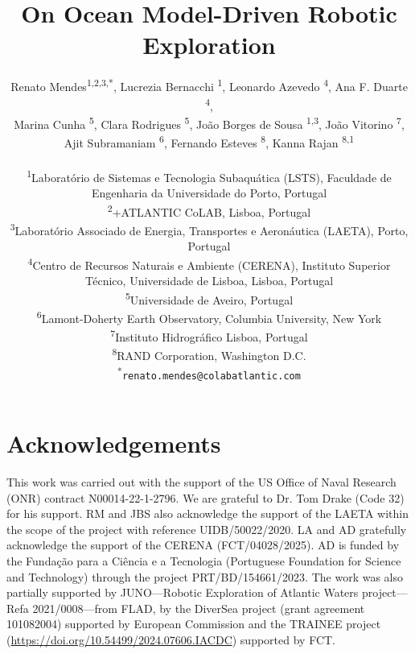 \documentclass[11pt]{article}
\title{On Ocean Model-Driven Robotic Exploration}
\author{
Renato Mendes\textsuperscript{1,2,3,*},
Lucrezia Bernacchi \textsuperscript{1},
Leonardo Azevedo \textsuperscript{4},
Ana F. Duarte \textsuperscript{4},\\
Marina Cunha \textsuperscript{5},
Clara Rodrigues \textsuperscript{5},
Jo\~{a}o Borges de Sousa \textsuperscript{1,3},
Jo\~{a}o Vitorino \textsuperscript{7},\\
Ajit Subramaniam \textsuperscript{6},
Fernando Esteves \textsuperscript{8},
Kanna Rajan \textsuperscript{8,1}
\\
\\
\textsuperscript{1}{\scriptsize Laboratório de Sistemas e Tecnologia Subaquática (LSTS), Faculdade de Engenharia da Universidade do Porto, Portugal}\\
\textsuperscript{2}{\scriptsize +ATLANTIC CoLAB, Lisboa, Portugal}\\
\textsuperscript{3}{\scriptsize Laboratório Associado de Energia, Transportes e Aeronáutica (LAETA), Porto, Portugal}\\
\textsuperscript{4}{\scriptsize Centro de Recursos Naturais e Ambiente (CERENA), Instituto Superior T\'{e}cnico, Universidade de Lisboa, Lisboa, Portugal}\\
\textsuperscript{5}{\scriptsize Universidade de Aveiro, Portugal}\\
\textsuperscript{6}{\scriptsize Lamont-Doherty Earth Observatory, Columbia University, New York}\\
\textsuperscript{7}{\scriptsize Instituto Hidrogr{\'a}fico Lisboa, Portugal}\\
\textsuperscript{8}{\scriptsize RAND Corporation, Washington D.C.}\\
\textsuperscript{*}\texttt{{\scriptsize renato.mendes@colabatlantic.com}}
}
\date{}
\begin{document}
\maketitle







\section{Acknowledgements}

This work was carried out with the support of the US Office of Naval
Research (ONR) contract N00014-22-1-2796. We are grateful to Dr. Tom
Drake (Code 32) for his support. RM and JBS also acknowledge the
support of the LAETA within the scope of the project with reference
UIDB/50022/2020. LA and AD gratefully acknowledge the support of the
CERENA (FCT/04028/2025). AD is funded by the Funda\c{c}\~{a}o para a
Ci\^{e}ncia e a Tecnologia (Portuguese Foundation for Science and
Technology) through the project PRT/BD/154661/2023. The work was also
partially supported by JUNO—Robotic Exploration of Atlantic Waters
project—Refa 2021/0008—from FLAD, by the DiverSea project (grant
agreement 101082004) supported by European Commission and the TRAINEE
project (\url{https://doi.org/10.54499/2024.07606.IACDC}) supported by
FCT.


\footnotesize{
  
}
\end{document}
